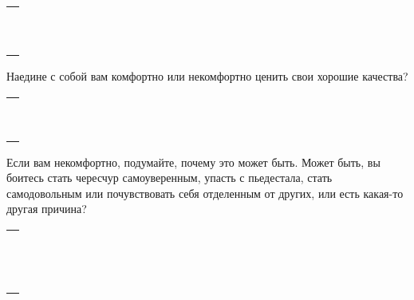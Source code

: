 \setlength{\extrarowheight}{2mm}
\begin{tabularx}{0.96\textwidth}{X}
	\\
	\arrayrulecolor{gray}\hline\\
	\hline\\
	\hline\\
	\hline\\
	\hline\\
	\hline\\	
	\hline\\
	\hline\\
	\hline\\
	\hline\\
	\hline\\
\end{tabularx}
\setlength{\extrarowheight}{0mm}
\begin{itemize}
	\itemWritingHand Наедине с собой вам комфортно или некомфортно ценить свои хорошие качества?
\end{itemize}

\setlength{\extrarowheight}{2mm}
\begin{tabularx}{0.96\textwidth}{X}
	\\
	\arrayrulecolor{gray}\hline\\
	\hline\\
	\hline\\
	\hline\\
	\hline\\
	\hline\\	
	\hline\\
	\hline\\
	\hline\\
	\hline\\
\end{tabularx}
\setlength{\extrarowheight}{0mm}
\begin{itemize}
	\itemWritingHand Если вам некомфортно, подумайте, почему это может быть. Может быть, вы боитесь стать чересчур самоуверенным, упасть с пьедестала, стать самодовольным или почувствовать себя отделенным от других, или есть какая-то другая причина?
\end{itemize}

\setlength{\extrarowheight}{2mm}
\begin{tabularx}{0.96\textwidth}{X}
	\\
	\arrayrulecolor{gray}\hline\\
	\hline\\
	\hline\\
	\hline\\
	\hline\\
	\hline\\	
	\hline\\
	\hline\\
	\hline\\
	\hline\\
	\hline\\
	\hline\\
	\hline\\
	\hline\\
\end{tabularx}
\setlength{\extrarowheight}{0mm}

